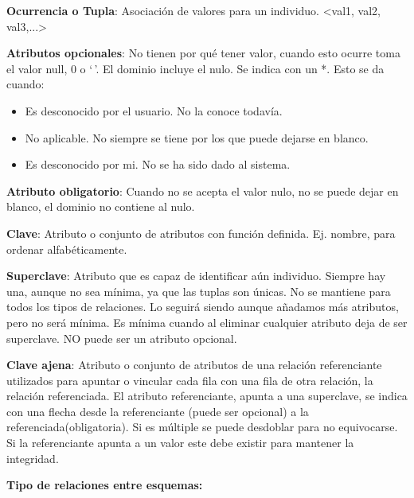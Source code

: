 \documentclass[12pt, twoside, openright]{report} %
\begin{document}
  
  \textbf{Ocurrencia o Tupla}: Asociación de valores para un individuo.
  \textless val1, val2, val3,...\textgreater{}
  

  
  \textbf{Atributos opcionales}: No tienen por qué tener valor, cuando
  esto ocurre toma el valor null, 0 o `\,'. El dominio incluye el nulo.
  Se indica con un *. Esto se da cuando:
  

  \begin{itemize}
  \item Es desconocido por el usuario. No la conoce todavía.
    
  \item No aplicable. No siempre se tiene por los que puede dejarse en
    blanco.
    
  \item Es desconocido por mi. No se ha sido dado al sistema.
    
  \end{itemize}

  
  \textbf{Atributo obligatorio}: Cuando no se acepta el valor nulo, no
  se puede dejar en blanco, el dominio no contiene al nulo.
  

  
  \textbf{Clave}: Atributo o conjunto de atributos con función definida.
  Ej. nombre, para ordenar alfabéticamente.
  

  
  \textbf{Superclave}: Atributo que es capaz de identificar aún
  individuo. Siempre hay una, aunque no sea mínima, ya que las tuplas
  son únicas. No se mantiene para todos los tipos de relaciones. Lo
  seguirá siendo aunque añadamos más atributos, pero no será mínima. Es
  mínima cuando al eliminar cualquier atributo deja de ser superclave.
  NO puede ser un atributo opcional.
  

  
  \textbf{Clave ajena}: Atributo o conjunto de atributos de una relación
  referenciante utilizados para apuntar o vincular cada fila con una
  fila de otra relación, la relación referenciada. El atributo
  referenciante, apunta a una superclave, se indica con una flecha desde
  la referenciante (puede ser opcional) a la referenciada(obligatoria).
  Si es múltiple se puede desdoblar para no equivocarse. Si la
  referenciante apunta a un valor este debe existir para mantener la
  integridad.
  

  
  \textbf{Tipo de relaciones entre esquemas:}
  
\end{document}
